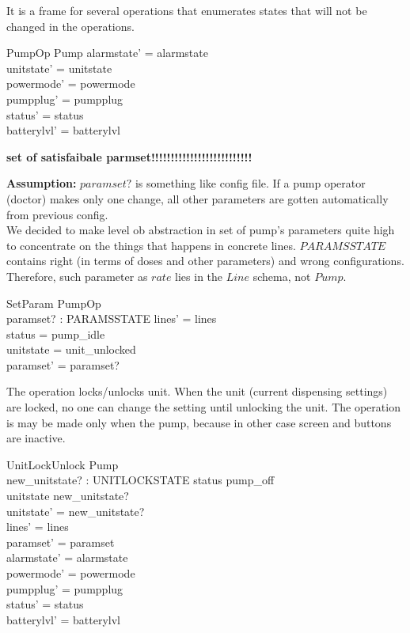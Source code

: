 \documentclass{article}
\begin{document}
	It is a frame for several operations that enumerates states that will not be changed in the operations.
	\begin{schema}{PumpOp}
		\Delta Pump
	\where
    	alarmstate' = alarmstate \\
    	unitstate' = unitstate \\
    	powermode' = powermode \\
    	pumpplug' = pumpplug\\
    	status' = status \\
    	batterylvl' = batterylvl
    \end{schema}
	

	\textbf{set of satisfaibale parmset!!!!!!!!!!!!!!!!!!!!!!!!!!}
	
	\textbf{Assumption:}  $paramset?$ is something like config file. If a pump operator (doctor) makes only one change, all other parameters are gotten automatically from previous config.\\
	We decided to make level ob abstraction in set of pump's parameters quite high to concentrate on the things that happens in concrete lines. $PARAMSSTATE$ contains right (in terms of doses and other parameters) and wrong configurations. Therefore, such parameter as $rate$ lies in the $Line$ schema, not $Pump$.
	\begin{schema}{SetParam}
		PumpOp \\
		paramset? : PARAMSSTATE 
	\where
	    lines' = lines  \\
		status = pump\_idle \\ 
		unitstate = unit\_unlocked \\
		paramset' = paramset?
	\end{schema}

	
		The operation locks/unlocks unit. When the unit (current dispensing settings) are locked, no one can change the setting until unlocking the unit. The operation is may be made only when the pump, because in other case screen and buttons are inactive.\\
    \begin{schema}{UnitLockUnlock}
		\Delta Pump \\
		new\_unitstate? : UNITLOCKSTATE
	\where
		status \neq pump\_off \\ 
		unitstate \neq new\_unitstate? \\
		unitstate' = new\_unitstate? \\
    	lines' = lines  \\
    	paramset' = paramset\\
    	alarmstate' = alarmstate \\
    	powermode' = powermode \\
    	pumpplug' = pumpplug \\
    	status' = status \\	
    	batterylvl' = batterylvl\\
	\end{schema}
\end{document}
